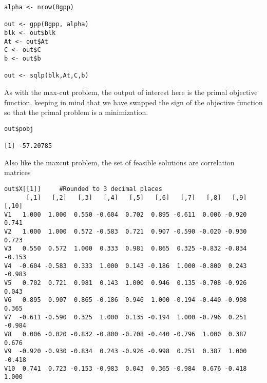 \documentclass{article}
\begin{document}
\begin{verbatim}
alpha <- nrow(Bgpp)

out <- gpp(Bgpp, alpha)
blk <- out$blk
At <- out$At
C <- out$C
b <- out$b

out <- sqlp(blk,At,C,b)
\end{verbatim}

As with the max-cut problem, the output of interest here is the primal objective function, keeping in mind that we have swapped the sign of the objective function so that the primal problem is a minimization.

\begin{verbatim}
out$pobj

[1] -57.20785
\end{verbatim}

Also like the maxcut problem, the set of feasible solutions are correlation matrices

\begin{verbatim}
out$X[[1]]     #Rounded to 3 decimal places
      [,1]   [,2]   [,3]   [,4]   [,5]   [,6]   [,7]   [,8]   [,9]  [,10]
V1   1.000  1.000  0.550 -0.604  0.702  0.895 -0.611  0.006 -0.920  0.741
V2   1.000  1.000  0.572 -0.583  0.721  0.907 -0.590 -0.020 -0.930  0.723
V3   0.550  0.572  1.000  0.333  0.981  0.865  0.325 -0.832 -0.834 -0.153
V4  -0.604 -0.583  0.333  1.000  0.143 -0.186  1.000 -0.800  0.243 -0.983
V5   0.702  0.721  0.981  0.143  1.000  0.946  0.135 -0.708 -0.926  0.043
V6   0.895  0.907  0.865 -0.186  0.946  1.000 -0.194 -0.440 -0.998  0.365
V7  -0.611 -0.590  0.325  1.000  0.135 -0.194  1.000 -0.796  0.251 -0.984
V8   0.006 -0.020 -0.832 -0.800 -0.708 -0.440 -0.796  1.000  0.387  0.676
V9  -0.920 -0.930 -0.834  0.243 -0.926 -0.998  0.251  0.387  1.000 -0.418
V10  0.741  0.723 -0.153 -0.983  0.043  0.365 -0.984  0.676 -0.418  1.000
\end{verbatim}
\end{document}
